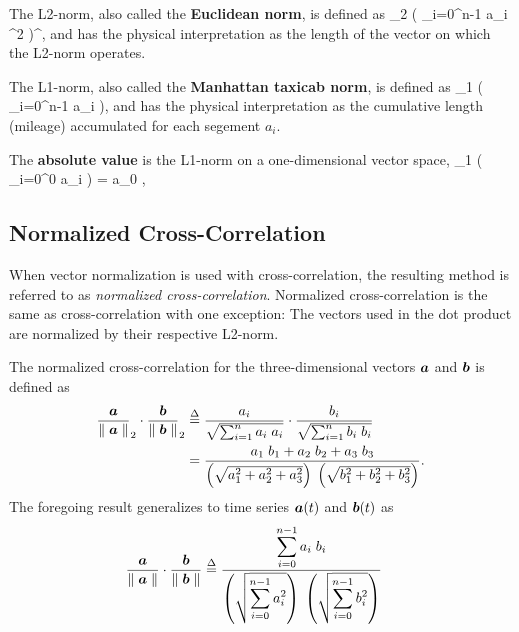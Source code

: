 \begin{Hexample}
	{
		The L2-norm, also called the {\bf Euclidean norm}, is defined as 
		\be
		 \parallel \va \parallel_2
		 \;  \left( 
		 \sum_{i=0}^{n-1} \mid a_i \mid^2 	 
		 \right)^{},
		 \label{eq:L2_norm}
		\ee
		and has the physical interpretation as the length of the vector
		on which the L2-norm operates.
	
		\medskip

		The L1-norm, also called the {\bf Manhattan taxicab norm}, is 
		defined as 
		\be
		 \parallel \va \parallel_1
		 \;  \left( 
		 \sum_{i=0}^{n-1} \mid a_i \mid 	 
		 \right),
		\ee
		and has the physical interpretation as the cumulative length 
		(mileage) accumulated for each segement $a_i$.

		\medskip

		The {\bf absolute value} is the L1-norm on a one-dimensional
		vector space, 
		\be
		 \parallel \va \parallel_1
		 \;  \left( 
		 \sum_{i=0}^{0} \mid a_i \mid 	 
		 \right) 
		 = 
		 \; \mid a_0 \mid,
		\ee
	}
\end{Hexample}

\subsection{Normalized Cross-Correlation}
When vector normalization is used with cross-correlation, the resulting
method is referred to as {\em normalized cross-correlation}.  
Normalized cross-correlation is the same as cross-correlation with 
one exception: The vectors used in the dot product are normalized by 
their respective L2-norm.  

The normalized cross-correlation for the three-dimensional vectors
$\mbox{\boldmath $a$}$ and $\mbox{\boldmath $b$}$ is defined as 
\begin{align}
\frac{\mbox{\boldmath $a$}}{\parallel \mbox{\boldmath $a$} \parallel}_2
\cdot
\frac{\mbox{\boldmath $b$}}{\parallel \mbox{\boldmath $b$} \parallel}_2
& \stackrel{\Delta}{=} 
\frac{a_i}{\sqrt{\sum_{i=1}^n a_i \; a_i}} 
\cdot
\frac{b_i}{\sqrt{\sum_{i=1}^n b_i \; b_i}}  \\
& = 
\frac{a_1 \; b_1 + a_2 \; b_2 + a_3 \; b_3}{
    \left(\sqrt{a_1^2 + a_2^2 + a_3^2}\right) \; 
    \left(\sqrt{b_1^2 + b_2^2 + b_3^2}\right)}. 
\end{align}
The foregoing result generalizes to time series $\mbox{\boldmath $a$}(t)$ and $\mbox{\boldmath $b$}(t)$ 
as 
\begin{align}
\frac{\mbox{\boldmath $a$}}{\parallel \mbox{\boldmath $a$} \parallel} 
\cdot
\frac{\mbox{\boldmath $b$}}{\parallel \mbox{\boldmath $b$} \parallel} 
& \stackrel{\Delta}{=} 
  \frac{\displaystyle\sum_{i=0}^{n-1} a_i \; b_i}
  {\left(\sqrt{\displaystyle\sum_{i=0}^{n-1} a_i^2}\right) \; 
   \left(\sqrt{\displaystyle\sum_{i=0}^{n-1} b_i^2}\right)} 
\end{align}

